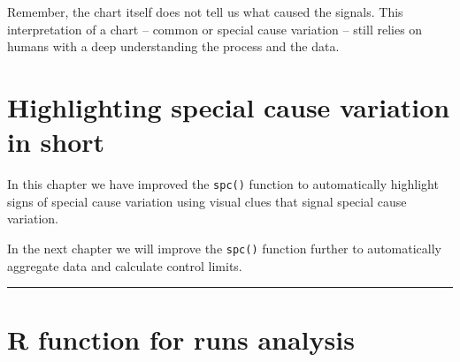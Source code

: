 \documentclass[
]{book}
\begin{document}
Remember, the chart itself does not tell us what caused the signals. This interpretation of a chart -- common or special cause variation -- still relies on humans with a deep understanding the process and the data.

\section{Highlighting special cause variation in short}\label{highlighting-special-cause-variation-in-short}

In this chapter we have improved the \texttt{spc()} function to automatically highlight signs of special cause variation using visual clues that signal special cause variation.

In the next chapter we will improve the \texttt{spc()} function further to automatically aggregate data and calculate control limits.

\begin{center}\rule{0.5\linewidth}{0.5pt}\end{center}

\section*{R function for runs analysis}\label{r-function-for-runs-analysis}
\end{document}

